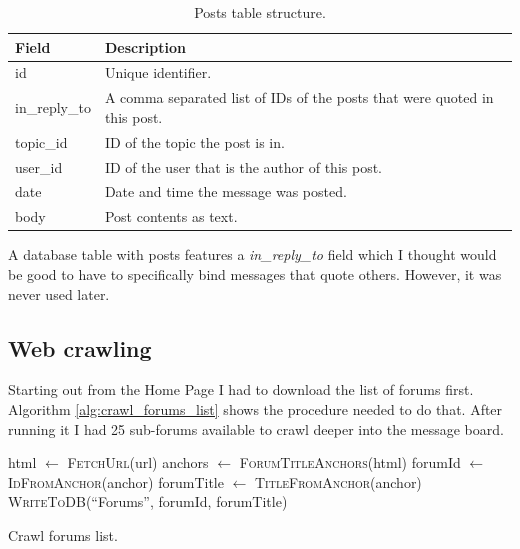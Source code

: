     \begin{table}[H]
      \begin{tabularx}{\textwidth}{|L{0.3}|L{1.7}|} \hline
         \textbf{Field} & \textbf{Description} \\\hline
        id & Unique identifier. \\
        in\_reply\_to & A comma separated list of IDs of the posts that were quoted in this post. \\
        topic\_id & ID of the topic the post is in. \\
        user\_id & ID of the user that is the author of this post. \\
        date & Date and time the message was posted. \\
        body & Post contents as text. \\\hline
      \end{tabularx}
      \caption{Posts table structure.}
      \label{tab:data_posts}
    \end{table}
    
    A database table with posts features a \emph{in\_reply\_to} field which I thought would be good to have to specifically bind messages that quote others. However, it was never used later.
    
  \subsection{Web crawling}
    \label{sec:crawling}
    
      Starting out from the Home Page I had to download the list of forums first. Algorithm \ref{alg:crawl_forums_list} shows the procedure needed to do that. After running it I had 25 sub-forums available to crawl deeper into the message board.
  
    \begin{algorithm}[H]
      \begin{algorithmic}[1]
          \State html $\gets$ \textsc{FetchUrl}(url)
          \State anchors $\gets$ \textsc{ForumTitleAnchors}(html)
            \State forumId $\gets$ \textsc{IdFromAnchor}(anchor)
            \State forumTitle $\gets$ \textsc{TitleFromAnchor}(anchor)
            \State \textsc{WriteToDB}(``Forums'', forumId, forumTitle)
          \EndFor
        \EndProcedure
      \end{algorithmic}
      \caption{Crawl forums list.}
      \label{alg:crawl_forums_list}
    \end{algorithm}
    
